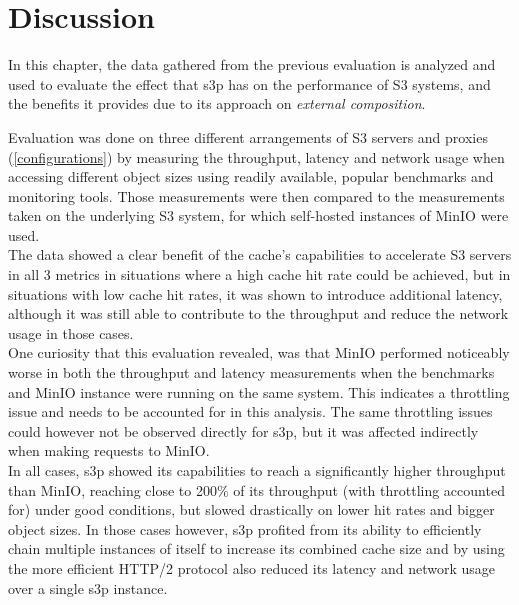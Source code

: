 \pagebreak

\chapter{Discussion}

In this chapter, the data gathered from the previous evaluation is analyzed and used to evaluate the effect that s3p has on the performance of S3 systems, and the benefits it provides due to its approach on \textit{external composition}.

Evaluation was done on three different arrangements of S3 servers and proxies (\ref{configurations}) by measuring the throughput, latency and network usage when accessing different object sizes using readily available, popular benchmarks and monitoring tools.
Those measurements were then compared to the measurements taken on the underlying S3 system, for which self-hosted instances of MinIO were used.
\\
The data showed a clear benefit of the cache's capabilities to accelerate S3 servers in all 3 metrics in situations where a high cache hit rate could be achieved, but in situations with low cache hit rates, it was shown to introduce additional latency, although it was still able to contribute to the throughput and reduce the network usage in those cases.
\\
One curiosity that this evaluation revealed, was that MinIO performed noticeably worse in both the throughput and latency measurements when the benchmarks and MinIO instance were running on the same system. This indicates a throttling issue and needs to be accounted for in this analysis. The same throttling issues could however not be observed directly for s3p, but it was affected indirectly when making requests to MinIO.
\\
In all cases, s3p showed its capabilities to reach a significantly higher throughput than MinIO, reaching close to 200\% of its throughput (with throttling accounted for) under good conditions, but slowed drastically on lower hit rates and bigger object sizes. In those cases however, s3p profited from its ability to efficiently chain multiple instances of itself to increase its combined cache size and by using the more efficient HTTP/2 protocol also reduced its latency and network usage over a single s3p instance.


